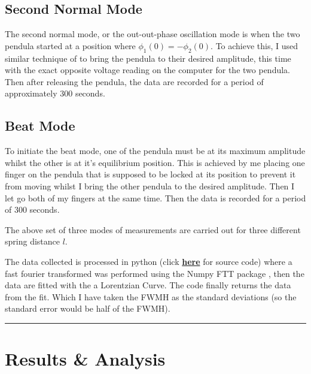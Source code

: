 \documentclass[aps,prl,reprint,10pt,amsmath,amssymb,superscriptaddress,a4paper]{revtex4-2}
\begin{document}
\subsection{Second Normal Mode}
The second normal mode, or the out-out-phase oscillation mode is when the two pendula started at a position where $\phi_1(0) = - \phi_2(0).$ To achieve this, I used similar technique of to bring the pendula to their desired amplitude, this time with the exact opposite voltage reading on the computer for the two pendula. Then after releasing the pendula, the data are recorded for a period of approximately 300 seconds.

\subsection{Beat Mode}
To initiate the beat mode, one of the pendula must be at its maximum amplitude whilst the other is at it's equilibrium position. This is achieved by me placing one finger on the pendula that is supposed to be locked at its position to prevent it from moving whilst I bring the other pendula to the desired amplitude. Then I let go both of my fingers at the same time. Then the data is recorded for a period of 300 seconds.

The above set of three modes of measurements are carried out for three different spring distance $l$. 

The data collected is processed in python (click \href{https://github.com/jojounderscorejo/CheatSheetRepo/blob/main/Otherthings/PHYS2113%20CP%20LAB/code/CP%20data%20analysis-checkpoint.ipynb}{\textbf{here}} for source code) where a fast fourier transformed was performed using the Numpy FTT package \cite{harris2020array}, then the data are fitted with the a Lorentzian Curve. The code finally returns the data from the fit. Which I have taken the FWMH as the standard deviations (so the standard error would be half of the FWMH).  
\par\noindent\rule{\linewidth}{0.4pt}

\section{Results \& Analysis}
\end{document}
